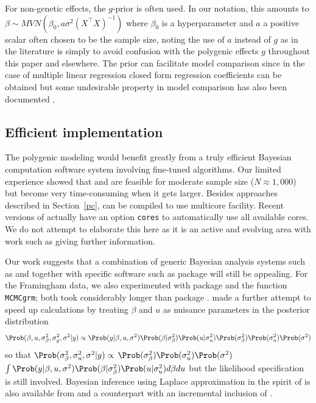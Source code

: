 \documentclass[article]{jss}
\begin{document}
For non-genetic effects, the $g$-prior \citep{zellner86} is often used. In our
notation, this amounts to $\beta\sim \mathit{MVN}(\beta_0, a\sigma^2(X^\top X)^{-1})$ 
where $\beta_0$ is a hyperparameter and $a$ a positive scalar often chosen 
to be the sample size, noting the use of $a$ instead of $g$ as in the 
literature is simply to avoid confusion with the polygenic effects $g$
throughout this paper and elsewhere. The prior can facilitate model comparison
since in the case of multiple linear regression closed form regression
coefficients can be obtained but some undesirable property in model 
comparison has also been documented \citep[e.g.,][]{pericchi05}.

\subsection{Efficient implementation}
The polygenic modeling would benefit greatly from a truly efficient
Bayesian computation software system involving fine-tuned algorithms.
Our limited experience showed that  and 
are feasible for moderate sample size ($N\approx 1,000$) but become very 
time-consuming when it gets larger. Besides approaches described in Section~\ref{pc}, 
 can be compiled to use multicore facility. Recent versions of
 actually have an option \verb/cores/ to automatically use all
available cores. We do not attempt to elaborate this here as it is an 
active and evolving area with work such as \cite{kruschke15} giving 
further information. 

Our work suggests that a combination of generic Bayesian analysis
systems such as  and  together with specific
software such as package  will still be appealing. For the
Framingham data, we also experimented with package  and
the function \verb/MCMCgrm/; both took considerably longer than
package . \cite{ahlinder13} made a further attempt to speed
up calculations by treating $\beta$ and $u$ as nuisance parameters in
the posterior distribution
$$\Prob(\beta,u,\sigma_\beta^2,\sigma_g^2,\sigma^2|y) 
\propto 
\Prob(y|\beta,u,\sigma^2)\Prob(\beta|\sigma_\beta^2)\Prob(u|\sigma_u^2)\Prob(\sigma_\beta^2)\Prob(\sigma_u^2)\Prob(\sigma^2)$$
 so that $\Prob(\sigma_\beta^2,\sigma_u^2,\sigma^2|y)\propto$ 
$\Prob(\sigma_\beta^2)\Prob(\sigma_u^2)\Prob(\sigma^2)$ $\int 
\Prob(y|\beta,u,\sigma^2)\Prob(\beta|\sigma_\beta^2)\Prob(u|\sigma_u^2)d\beta 
du$ but 
the likelihood specification is still involved. Bayesian inference using 
Laplace approximation in the spirit of  is also available from 
 \citep{LaplacesDemon} and a counterpart 
 \citep{LaplacesDemonCpp} with an incremental 
inclusion of .
\end{document}
